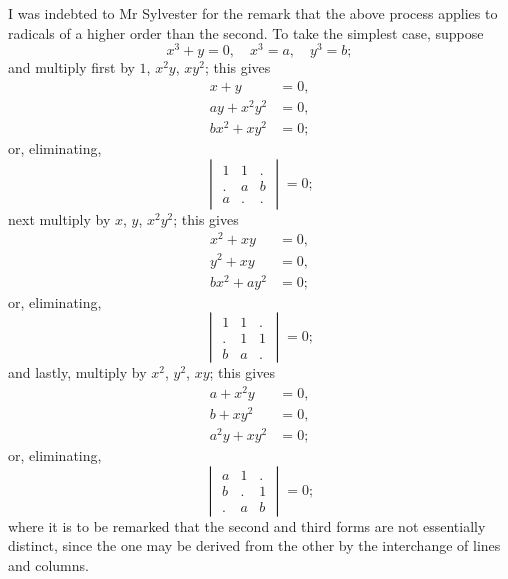 \documentclass[11pt,a4paper]{book}
\begin{document}
I was indebted to Mr Sylvester for the remark that the above process applies to radicals of a higher order than the second. To take the simplest case, suppose
\[
x^3 + y = 0, \quad x^3 = a, \quad y^3 = b;
\]
and multiply first by $1$, $x^2y$, $xy^2$; this gives
\begin{align*}
x + y &= 0,\\
ay + x^2y^2 &= 0,\\
bx^2 + xy^2 &= 0;
\end{align*}
or, eliminating,
\[
\begin{vmatrix}
1 & 1 & . \\
. & a & b \\
a & . & .
\end{vmatrix} = 0;
\]
next multiply by $x$, $y$, $x^2y^2$; this gives
\begin{align*}
x^2 + xy &= 0,\\
y^2 + xy &= 0,\\
bx^2 + ay^2 &= 0;
\end{align*}
or, eliminating,
\[
\begin{vmatrix}
1 & 1 & . \\
. & 1 & 1 \\
b & a & .
\end{vmatrix} = 0;
\]
and lastly, multiply by $x^2$, $y^2$, $xy$; this gives
\begin{align*}
a + x^2y &= 0,\\
b + xy^2 &= 0,\\
a^2y + xy^2 &= 0;
\end{align*}
or, eliminating,
\[
\begin{vmatrix}
a & 1 & . \\
b & . & 1 \\
. & a & b
\end{vmatrix} = 0;
\]
where it is to be remarked that the second and third forms are not essentially distinct, since the one may be derived from the other by the interchange of lines and columns.

\newpage
\setcounter{page}{43}
\end{document}
